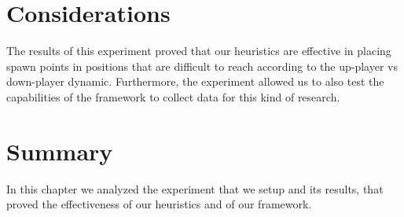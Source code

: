 
\section{Considerations}

The results of this experiment proved that our heuristics are effective in placing spawn points in positions that are difficult to reach according to the up-player vs down-player dynamic. Furthermore, the experiment allowed us to also test the capabilities of the framework to collect data for this kind of research.


\section{Summary}

In this chapter we analyzed the experiment that we setup and its results, that proved the effectiveness of our heuristics and of our framework.
